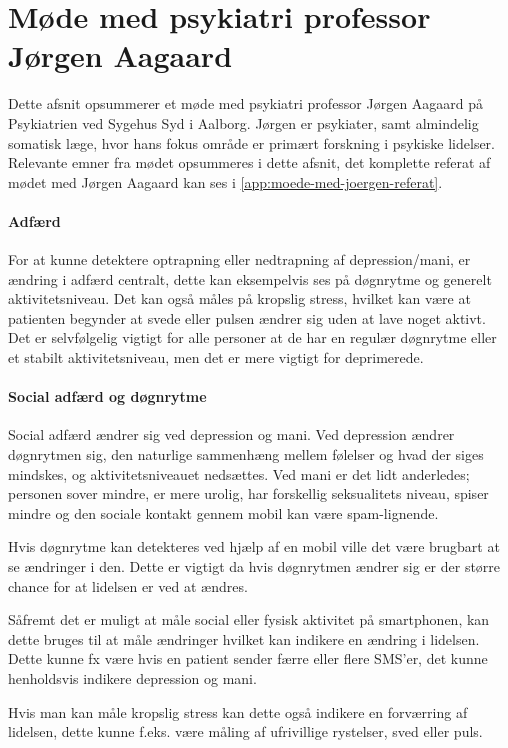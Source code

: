 \section{Møde med psykiatri professor Jørgen Aagaard}\label{sec:moede-med-joergen}
Dette afsnit opsummerer et møde med psykiatri professor Jørgen Aagaard på Psykiatrien ved Sygehus Syd i Aalborg. 
Jørgen er psykiater, samt almindelig somatisk læge, hvor hans fokus område er primært forskning i psykiske lidelser.
Relevante emner fra mødet opsummeres i dette afsnit, det komplette referat af mødet med Jørgen Aagaard kan ses i \cref{app:moede-med-joergen-referat}.

\paragraph{Adfærd}
For at kunne detektere optrapning eller nedtrapning af depression/mani, er ændring i adfærd centralt, dette kan eksempelvis ses på døgnrytme og generelt aktivitetsniveau. 
Det kan også måles på kropslig stress, hvilket kan være at patienten begynder at svede eller pulsen ændrer sig uden at lave noget aktivt. 
Det er selvfølgelig vigtigt for alle personer at de har en regulær døgnrytme eller et stabilt aktivitetsniveau, men det er mere vigtigt for deprimerede.

\paragraph{Social adfærd og døgnrytme}
Social adfærd ændrer sig ved depression og mani.
Ved depression ændrer døgnrytmen sig, den naturlige sammenhæng mellem følelser og hvad der siges mindskes, og aktivitetsniveauet nedsættes.
Ved mani er det lidt anderledes; personen sover mindre, er mere urolig, har forskellig seksualitets niveau, spiser mindre og den sociale kontakt gennem mobil kan være spam-lignende. 

Hvis døgnrytme kan detekteres ved hjælp af en mobil ville det være brugbart at se ændringer i den.
Dette er vigtigt da hvis døgnrytmen ændrer sig er der større chance for at lidelsen er ved at ændres.

Såfremt det er muligt at måle social eller fysisk aktivitet på smartphonen, kan dette bruges til at måle ændringer hvilket kan indikere en ændring i lidelsen.
Dette kunne fx være hvis en patient sender færre eller flere SMS'er, det kunne henholdsvis indikere depression og mani.

Hvis man kan måle kropslig stress kan dette også indikere en forværring af lidelsen, dette kunne f.eks. være måling af ufrivillige rystelser, sved eller puls. 


